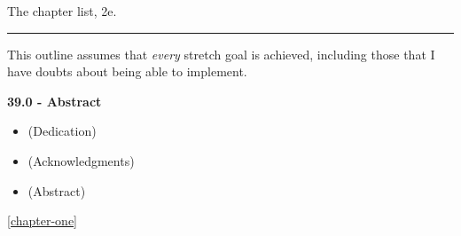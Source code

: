 The chapter list, 2e.

\begin{center}\rule{0.5\linewidth}{0.5pt}\end{center}

This outline assumes that \emph{every} stretch goal is achieved,
including those that I have doubts about being able to implement.

\textbf{39.0 - Abstract}

\begin{itemize}
\tightlist
\item
  (Dedication)
\item
  (Acknowledgments)
\item
  (Abstract)
\end{itemize}

\autoref{chapter-one}

